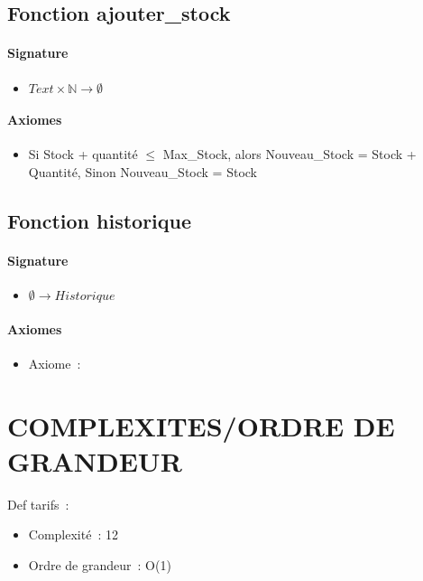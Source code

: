 \documentclass[]{article}
\begin{document}
\subsection*{Fonction ajouter\_stock}
\paragraph{Signature}
\begin{itemize}
\item
  $  Text \times \mathbb{N} \longrightarrow \emptyset$
\end{itemize}
\paragraph{Axiomes}
\begin{itemize}
\item
 Si Stock + quantité \(\leq \) Max\_Stock, alors Nouveau\_Stock =
  Stock + Quantité,
Sinon Nouveau\_Stock = Stock
\end{itemize}

\subsection*{Fonction historique}
\paragraph{Signature}
\begin{itemize}
\item
  $  \emptyset \longrightarrow Historique$
\end{itemize}
\paragraph{Axiomes}
\begin{itemize}
\item
  Axiome~:
\end{itemize}
\pagebreak
\section*{COMPLEXITES/ORDRE DE GRANDEUR}

Def tarifs~:

\begin{itemize}
\item
  Complexité~: 12
\item
  Ordre de grandeur~: O(1)
\end{itemize}
\end{document}
